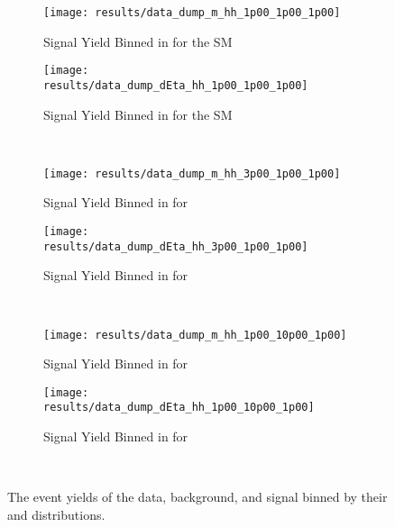     \begin{figure}
        \centering
        \begin{subfigure}{0.48\textwidth} 
            \texttt{[image: results/data\_dump\_m\_hh\_1p00\_1p00\_1p00]}
            \caption{Signal Yield Binned in \mhh for the SM}
            \label{fig:data_dump_m_hh_1p00_1p00_1p00}
        \end{subfigure}
        \begin{subfigure}{0.48\textwidth}
            \texttt{[image: results/data\_dump\_dEta\_hh\_1p00\_1p00\_1p00]}
            \caption{Signal Yield Binned in \deta for the SM}
            \label{fig:data_dump_dEta_hh_1p00_1p00_1p00}
        \end{subfigure}\\
        \begin{subfigure}{0.48\textwidth} 
            \texttt{[image: results/data\_dump\_m\_hh\_3p00\_1p00\_1p00]}
            \caption{Signal Yield Binned in \mhh for }
            \label{fig:data_dump_m_hh_3p00_1p00_1p00}
        \end{subfigure}
        \begin{subfigure}{0.48\textwidth}
            \texttt{[image: results/data\_dump\_dEta\_hh\_3p00\_1p00\_1p00]}
            \caption{Signal Yield Binned in \deta for }
            \label{fig:data_dump_dEta_hh_3p00_1p00_1p00}
        \end{subfigure}\\
        \begin{subfigure}{0.48\textwidth} 
            \texttt{[image: results/data\_dump\_m\_hh\_1p00\_10p00\_1p00]}
            \caption{Signal Yield Binned in \mhh for }
            \label{fig:data_dump_m_hh_1p00_10p00_1p00}
        \end{subfigure}
        \begin{subfigure}{0.48\textwidth}
            \texttt{[image: results/data\_dump\_dEta\_hh\_1p00\_10p00\_1p00]}
            \caption{Signal Yield Binned in \deta for }
            \label{fig:data_dump_dEta_hh_1p00_10p00_1p00}
        \end{subfigure}\\
        \caption{
            \scriptsize
            The event yields of the data, background, and signal binned by their \mhh and \deta distributions.
}
\end{figure}
